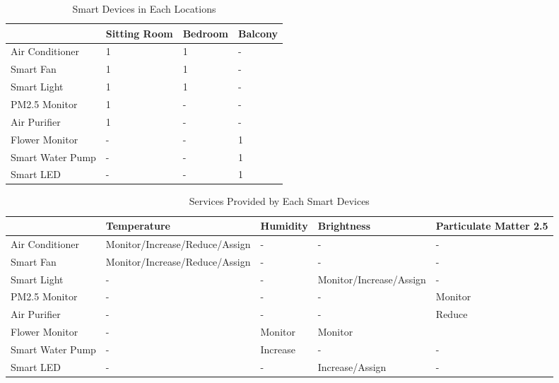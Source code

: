 \begin{table}[htbp]
	\caption{Smart Devices in Each Locations}
	\centering  %
	\label{table1}  %
	\renewcommand\arraystretch{1.5}  %
	\begin{tabular}{p{3.5cm} p{2.5cm}<{\centering} p{2cm}<{\centering} p{2cm}<{\centering}}  %
    \toprule[1.5pt]
	 & Sitting Room & Bedroom & Balcony \\
	\midrule[1.5pt]

	Air Conditioner & 1 & 1 & -\\

	Smart Fan       & 1 & 1 & -\\

	Smart Light     & 1 & 1 & -\\

	PM2.5 Monitor   & 1 & - & -\\

	Air Purifier    & 1 & - & -\\

	Flower Monitor  & - & - & 1\\

	Smart Water Pump& - & - & 1\\

	Smart LED       & - & - & 1\\
	\bottomrule[1.5pt]
	\end{tabular}
\end{table}

\begin{table}[htbp] %
	\centering  %
	\caption{Services Provided by Each Smart Devices}
	\label{table2}
	\renewcommand\arraystretch{1.5}  %
	\begin{tabular}{p{3cm} p{2cm}<{\centering} p{2cm}<{\centering} p{2cm}<{\centering} p{2cm}<{\centering}}  %
		
		\toprule[1.5pt]
		& Temperature & Humidity & Brightness & Particulate Matter 2.5 \\
		\midrule[1.5pt]
		
		Air Conditioner & Monitor/Increase/Reduce/Assign & - & - & -\\
		
		Smart Fan       & Monitor/Increase/Reduce/Assign & - & - & -\\
		
		Smart Light     & - & - & Monitor/Increase/Assign & -\\
		
		PM2.5 Monitor   & - & - & - & Monitor\\
		
		Air Purifier    & - & - & - & Reduce\\
		
		Flower Monitor  & - & Monitor & Monitor &\\
		
		Smart Water Pump& - & Increase & - & -\\
		
		Smart LED       & - & - & Increase/Assign & -\\
		\bottomrule[1.5pt]
	\end{tabular}
\end{table}



